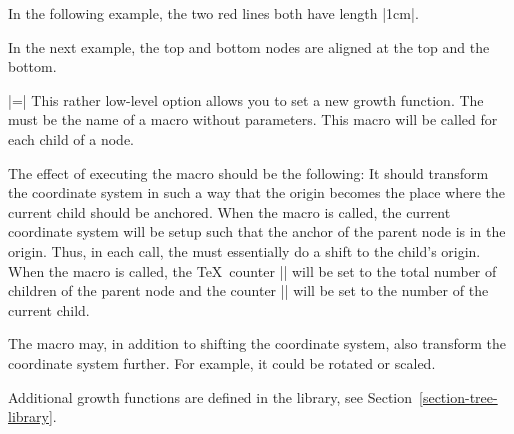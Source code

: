 \begin{itemize}
  In the following example, the two red lines both have length |1cm|.
\begin{codeexample}[]
\end{codeexample}

  In the next example, the top and bottom nodes are aligned at the top
  and the bottom.
\begin{codeexample}[]
\end{codeexample}

  |=|
  This rather low-level option allows you to set a new growth
  function. The  must be the name of a macro without
  parameters. This macro will be called for each child of a node.

  The effect of executing the macro should be the following: It should
  transform the coordinate system in such a way that the origin
  becomes the place where the current child should be anchored. When
  the macro is called, the current coordinate system will be setup
  such that the anchor of the parent node is in the origin. Thus, in
  each call, the  must essentially do a shift to the
  child's origin. When the macro is called, the \TeX\ counter
  |\tikznumberofchildren| will be set to the total number of children
  of the parent node and the counter |\tikznumberofcurrentchild| will
  be set to the number of the current child.

  The macro may, in addition to shifting the coordinate system, also
  transform the coordinate system further. For example, it could be
  rotated or scaled.

  Additional growth functions are defined in the library, see 
  Section~\ref{section-tree-library}.
\end{itemize}



